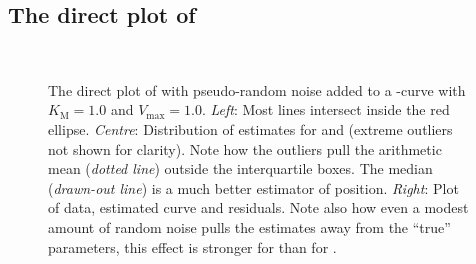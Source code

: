\begin{refsection}
\section{The direct plot of }

\begin{figure}
 \caption{The direct plot of  with pseudo-random noise added to a -curve with \(K_\mathrm{M} = 1.0 \) and \(V_\mathrm{max} = 1.0 \). \emph{Left}: Most lines intersect inside the red ellipse. \emph{Centre}: Distribution of estimates for  and  (extreme outliers not shown for clarity). Note how the outliers pull the arithmetic mean (\emph{dotted line}) outside the interquartile boxes. The median (\emph{drawn-out line}) is a much better estimator of position. \emph{Right}: Plot of data, estimated curve and residuals. Note also how even a modest amount of random noise pulls the estimates away from the ``true'' parameters, this effect is stronger for  than for . }
 \label{fig:Eisenthal}
 \centering
 \hfill
 \hfill
 \\
\end{figure}


\end{refsection}
